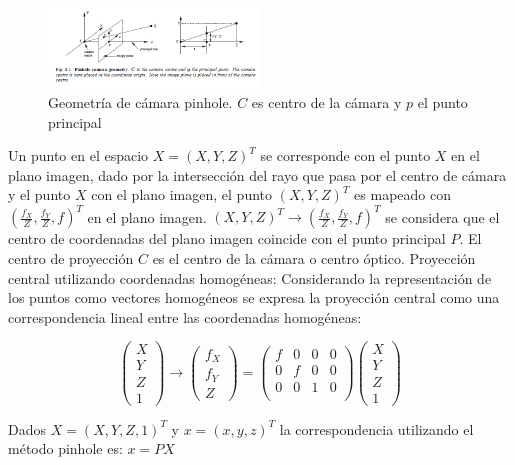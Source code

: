 \begin{figure}[H]
  \centering
    \includegraphics[width=0.5\textwidth]{./Cap6_reconstruccion/pinhole.png}
  \caption{Geometría de cámara pinhole. $C$ es centro de la cámara y $p$ el punto principal}
  \label{fig:Calib-Pinhole}
\end{figure}

Un punto en el espacio $X=(X,Y,Z)^T$ se corresponde con el punto $X$ en el plano imagen, dado por la intersección del rayo que pasa por el centro de cámara y el punto $X$ con el plano imagen, el punto $(X,Y,Z)^T$ es mapeado con $(\frac{f_X}{Z}, \frac{f_Y}{Z}, f)^T$ en el plano imagen.
$(X, Y, Z)^T \to (\frac{f_X}{Z}, \frac{f_Y}{Z},f)^T$ se considera que el centro de coordenadas del plano imagen coincide con el punto principal $P$.
El centro de proyección $C$ es el centro de la cámara o centro óptico.
Proyección central utilizando coordenadas homogéneas:
Considerando la representación de los puntos como vectores homogéneos se expresa la proyección central como una correspondencia lineal entre las coordenadas homogéneas:

\[
\begin{pmatrix}
X \\ Y \\ Z \\ 1
\end{pmatrix}
\to
\begin{pmatrix}
f_X \\ f_Y \\ Z
\end{pmatrix}
=
\begin{pmatrix}
f & 0 & 0 & 0 \\
0 & f & 0 & 0 \\
0 & 0 & 1 & 0 \\
\end{pmatrix}
\begin{pmatrix}
X \\ Y \\ Z \\ 1
\end{pmatrix}
\]

Dados $X = (X,Y,Z,1)^T$ y $x =(x,y,z)^T$ la correspondencia utilizando el método pinhole es:
$x=PX$

